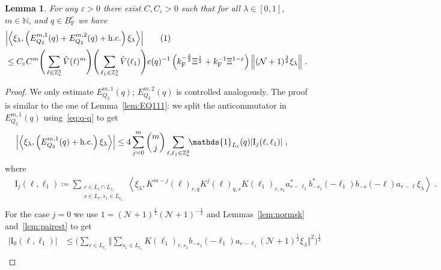 \documentclass[12pt,a4paper]{article}
\numberwithin{equation}{section}
\newcommand{\NNN}{\mathbb{N}}
\newcommand{\1}{\mathbb{I}}
\newcommand{\F}{\mathrm{F}}
\newcommand{\I}{\mathrm{I}}
\newcommand{\tagg}[1]{ \stepcounter{equation} \tag{\theequation}
\label{#1} } %
\newcommand{\Z}{\mathbb{Z}}
\newcommand{\NN}{\mathcal{N}}
\newcommand{\half}{\frac{1}{2}}
\newcommand{\eva}[1]{\left\langle #1 \right\rangle}
\theoremstyle{plain}
\newtheorem{lemma}[theorem]{Lemma}
\theoremstyle{definition}
\theoremstyle{remark}
\theoremstyle{plain}
\theoremstyle{definition}
\theoremstyle{remark}
\begin{document}
\begin{lemma} \label{lem:EQ211}
For any $ \varepsilon > 0 $ there exist $ C, C_\varepsilon > 0 $ such that for all $ \lambda \in [0,1] $, $ m \in \NNN $, and $ q \in B_{\F}^c $ we have
\begin{align*}
	&\abs{\eva{\xi_\lambda,\left(E^{m,1}_{Q_2}(q) + E^{m,2}_{Q_2}(q) + \mathrm{h.c.}\right) \xi_\lambda }} \tagg{eq:estEQ211} \\
	&\leq C_\varepsilon C^m \Bigg(\sum_{\ell \in \Z^3_*} \hat{V}(\ell)^m\Bigg)
		\Bigg( \sum_{\ell_1 \in \Z^3_*} \hat{V}(\ell_1) \Bigg)
		e(q)^{-1} \left( k_{\F}^{-\frac{3}{2}} \Xi^\half 
		+ k_{\F}^{-1}\Xi^{1-\varepsilon} \right)
		\norm { (\NN+1)^{\frac 32} \xi_\lambda } \;.
\end{align*}
\end{lemma}
\begin{proof}
We only estimate $ E^{m,1}_{Q_2}(q) $; $ E^{m,2}_{Q_2}(q) $ is controlled analogously.
The proof is similar to the one of Lemma~\ref{lem:EQ111}: we split the anticommutator in $ E^{m,1}_{Q_2}(q) $ using~\eqref{eq:q-q} to get
\begin{equation} \label{eq:EQ2111}
\begin{aligned}
	& \abs{\eva{\xi_\lambda,\left(E^{m,1}_{Q_2}(q) + \mathrm{h.c.}\right) \xi_\lambda }}
	\le 4 \sum_{j=0}^m {{m}\choose j} \sum_{\ell,\ell_1 \in \Z^3_*}\!\! \mathds{1}_{L_\ell}(q) |\I_j(\ell, \ell_1)| \;,
	\end{aligned}
\end{equation}
where
\begin{equation}
\begin{aligned}
	& \I_j(\ell, \ell_1)
	\coloneq \sum_{\substack{r\in L_{\ell} \cap L_{\ell_1}\\ s \in L_{\ell},s_1\in L_{\ell_1}}}
		\eva{\xi_\lambda, K^{m-j}(\ell)_{r,q} K^{j}(\ell)_{q,s} K(\ell_1)_{r,s_1} a^*_{r-\ell_1} b^*_{-s_1}(-\ell_1) b_{-s}(-\ell) a_{r-\ell} \xi_\lambda} \;. \\
\end{aligned}
\end{equation}
For the case $ j = 0 $ we use $1 = (\NN+1)^{\half}(\NN+1)^{-\half}$ and Lemmas~\ref{lem:normsk} and~\ref{lem:pairest} to get
\begin{align}
	|\I_0(\ell, \ell_1)|
 	&\leq \Bigg( \sum_{r \in L_{\ell_1}}
 		\Bigg\Vert \sum_{s_1 \in L_{\ell_1}} K(\ell_1)_{r,s_1} b_{-s_1}(-\ell_1) a_{r-\ell_1} (\NN+1)^{\half}\xi_\lambda \Bigg\Vert^2\Bigg)^\half \nonumber\\

\end{align}
\end{proof}
\end{document}
